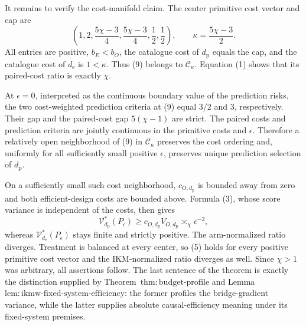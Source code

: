 It remains to verify the cost-manifold claim.  The center primitive cost vector and cap are
\[
 \left(1,2,\frac{5\chi-3}{4},\frac{5\chi-3}{4},
 \frac12,\frac12\right),
 \qquad \kappa=\frac{5\chi-3}{2}.                     \tag{9}
\]
All entries are positive, \(b_E<b_O\), the catalogue cost of \(d_{\mathrm p}\) equals the cap, and the catalogue cost of \(d_{\mathrm e}\) is \(1<\kappa\).  Thus (9) belongs to \(\mathcal C_\kappa\).  Equation (1) shows that its paired-cost ratio is exactly \(\chi\).

At \(\epsilon=0\), interpreted as the continuous boundary value of the prediction risks, the two cost-weighted prediction criteria at (9) equal \(3/2\) and \(3\), respectively.  Their gap and the paired-cost gap \(5(\chi-1)\) are strict.  The paired costs and prediction criteria are jointly continuous in the primitive costs and \(\epsilon\).  Therefore a relatively open neighborhood of (9) in \(\mathcal C_\kappa\) preserves the cost ordering and, uniformly for all sufficiently small positive \(\epsilon\), preserves unique prediction selection of \(d_{\mathrm p}\).

On a sufficiently small such cost neighborhood, \(c_{O,d_{\mathrm p}}\) is bounded away from zero and both efficient-design costs are bounded above.  Formula (3), whose score variance is independent of the costs, then gives
\[
 \mathcal V_{d_{\mathrm p}}^*(P_\epsilon)
 \ge c_{O,d_{\mathrm p}}V_{O,d_{\mathrm p}}
 \asymp_\chi\epsilon^{-2},                            \tag{10}
\]
whereas \(\mathcal V_{d_{\mathrm e}}^*(P_\epsilon)\) stays finite and strictly positive.  The arm-normalized ratio diverges.  Treatment is balanced at every center, so (5) holds for every positive primitive cost vector and the IKM-normalized ratio diverges as well.  Since \(\chi>1\) was arbitrary, all assertions follow.  The last sentence of the theorem is exactly the distinction supplied by Theorem~\(\mathrm{thm{:}budget\text{-}profile}\) and Lemma~\(\mathrm{lem{:}ikmw\text{-}fixed\text{-}system\text{-}efficiency}\): the former profiles the bridge-gradient variance, while the latter supplies absolute causal-efficiency meaning under its fixed-system premises.
